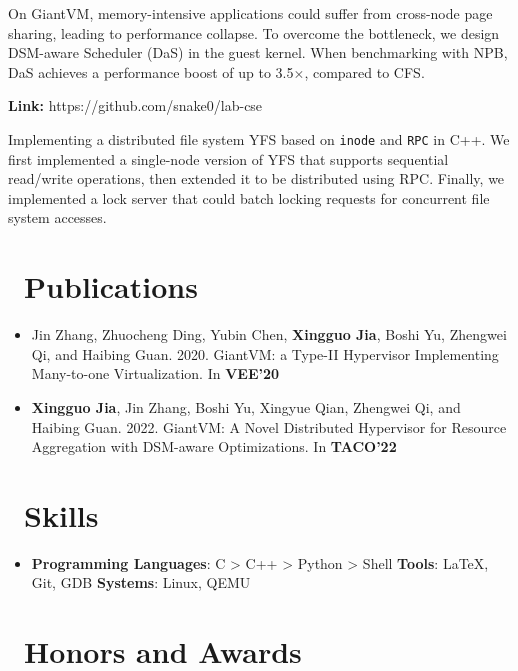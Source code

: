 \documentclass{resume}
\begin{document}
On GiantVM, memory-intensive applications could suffer from cross-node page sharing, leading to performance collapse. To overcome the bottleneck, we design DSM-aware Scheduler (DaS) in the guest kernel. When benchmarking with NPB, DaS achieves a performance boost of up to 3.5$\times$, compared to CFS. 

\textbf{Link:} https://github.com/snake0/lab-cse

Implementing a distributed file system YFS based on \texttt{inode} and \texttt{RPC} in C++. We first implemented a single-node version of YFS that supports sequential read/write operations, then extended it to be distributed using RPC. Finally, we implemented a lock server that could batch locking requests for concurrent file system accesses.

\section{\faGraduationCap\ Publications}
\begin{itemize}
\item Jin Zhang, Zhuocheng Ding, Yubin Chen, \textbf{Xingguo Jia}, Boshi Yu, Zhengwei Qi, and Haibing Guan. 2020. GiantVM: a Type-II Hypervisor Implementing Many-to-one Virtualization. In \textbf{VEE'20}
\item \textbf{Xingguo Jia}, Jin Zhang, Boshi Yu, Xingyue Qian, Zhengwei Qi, and Haibing Guan. 2022. GiantVM: A Novel Distributed Hypervisor for Resource Aggregation with DSM-aware Optimizations. In \textbf{TACO'22}
\end{itemize}

\section{\faCogs\ Skills}
\begin{itemize}[parsep=0.5ex]
  \item \textbf{Programming Languages}: C > C++ > Python > Shell \textbf{Tools}: \LaTeX, Git, GDB \textbf{Systems}: Linux, QEMU
\end{itemize}

\section{\faHeartO\ Honors and Awards}
\end{document}
